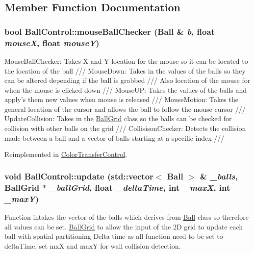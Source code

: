 \subsection{Member Function Documentation}
\hypertarget{classBallControl_a4f811993f5e8988eb4f4ab3c03dadf52}{
\subsubsection[{mouseBallChecker}]{\setlength{\rightskip}{0pt plus 5cm}bool BallControl::mouseBallChecker ({\bf Ball} \& {\em b}, \/  float {\em mouseX}, \/  float {\em mouseY})}}
\label{classBallControl_a4f811993f5e8988eb4f4ab3c03dadf52}
MouseBallChecker: Takes X and Y location for the mouse so it can be located to the location of the ball /// MouseDown: Takes in the values of the balls so they can be altered depending if the ball is grabbed /// Also location of the mouse for when the mouse is clicked down /// MouseUP: Takes the values of the balls and apply's them new values when mouse is released /// MouseMotion: Takes the general location of the cursor and allows the ball to follow the mouse cursor /// UpdateCollision: Takes in the \hyperlink{classBallGrid}{BallGrid} class so the balls can be checked for collision with other balls on the grid /// CollisisonChecker: Detects the collision made between a ball and a vector of balls starting at a specific index /// 

Reimplemented in \hyperlink{classColorTransferControl_a9bce863f9d08a2dd596a56a432861559}{ColorTransferControl}.\hypertarget{classBallControl_af32a9b232b26af69231966ae3aab98d5}{
\subsubsection[{update}]{\setlength{\rightskip}{0pt plus 5cm}void BallControl::update (std::vector$<$ {\bf Ball} $>$ \& {\em \_\-balls}, \/  {\bf BallGrid} $\ast$ {\em \_\-ballGrid}, \/  float {\em \_\-deltaTime}, \/  int {\em \_\-maxX}, \/  int {\em \_\-maxY})}}
\label{classBallControl_af32a9b232b26af69231966ae3aab98d5}
Function intakes the vector of the balls which derives from \hyperlink{structBall}{Ball} class so therefore all values can be set. \hyperlink{classBallGrid}{BallGrid} to allow the input of the 2D grid to update each ball with spatial partitioning Delta time as all function need to be set to deltaTime, set mxX and maxY for wall collision detection. 


